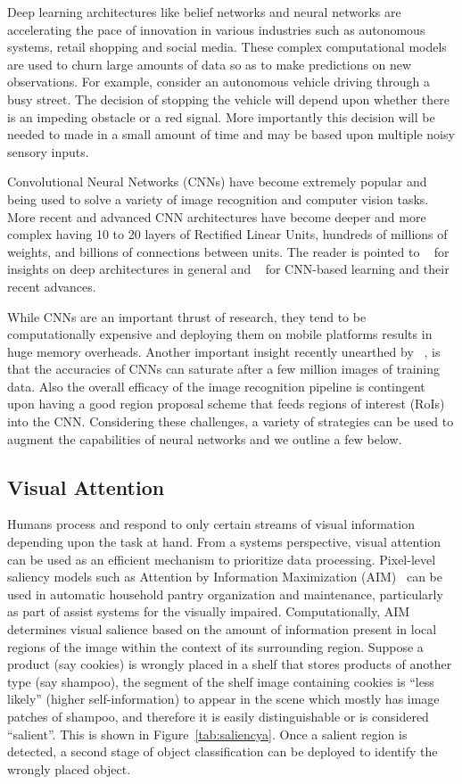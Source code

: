 Deep learning architectures like belief networks and neural networks are accelerating the pace of innovation in various industries such as autonomous systems, 
retail shopping and social media. These complex computational models are used to churn large amounts of data so as to make predictions on new observations. 
For example, consider an autonomous vehicle driving through a busy street. The decision of stopping the vehicle will depend upon whether there is an 
impeding obstacle or a red signal. More importantly this decision will be needed to made in a small amount of time and may be based upon multiple noisy sensory inputs.
 
Convolutional Neural Networks (CNNs) have become extremely popular and being used to solve a variety of image recognition and computer vision tasks. 
More recent and advanced CNN architectures have become deeper and more complex having 10 to 20 
layers of Rectified Linear Units, hundreds of millions of weights, and billions of connections between units.
The reader is pointed to ~\cite{Bengio2009} for insights on deep architectures in general and ~\cite{DNNNature2015} for CNN-based learning and their recent advances.

While CNNs are an important thrust of research, they tend to be computationally expensive and deploying them on mobile platforms results in huge memory overheads. 
Another important insight recently unearthed by ~\cite{facenet}, is that the accuracies of CNNs can saturate after a few million images of training data.
Also the overall efficacy of the image recognition pipeline is contingent upon having a good region proposal scheme that feeds regions of interest (RoIs) into the CNN. 
Considering these challenges, a variety of strategies can be used to augment the capabilities of neural networks and we outline a few below.

\subsection{Visual Attention}
Humans process and respond to only certain streams of visual information depending upon the task at hand. 
From a systems perspective, visual attention can be used as an efficient mechanism to prioritize data processing.  
Pixel-level saliency models such as Attention by Information Maximization (AIM)~\cite{Bruceb} can be used in 
automatic household pantry organization and maintenance, particularly 
as part of assist systems for the visually impaired. Computationally, AIM determines visual salience based on the amount of information present in 
local regions of the image within the context of its surrounding region. 
Suppose a product (say cookies) is wrongly placed in a shelf that stores products of another type (say shampoo), the segment of the shelf image containing cookies is 
``less likely'' (higher self-information) to appear in the scene which mostly has image patches of shampoo, 
and therefore it is easily distinguishable or is considered ``salient''. This is shown in Figure~\ref{tab:saliencya}.
Once a salient region is detected, a second stage of object classification can be deployed to identify the wrongly placed object.  

